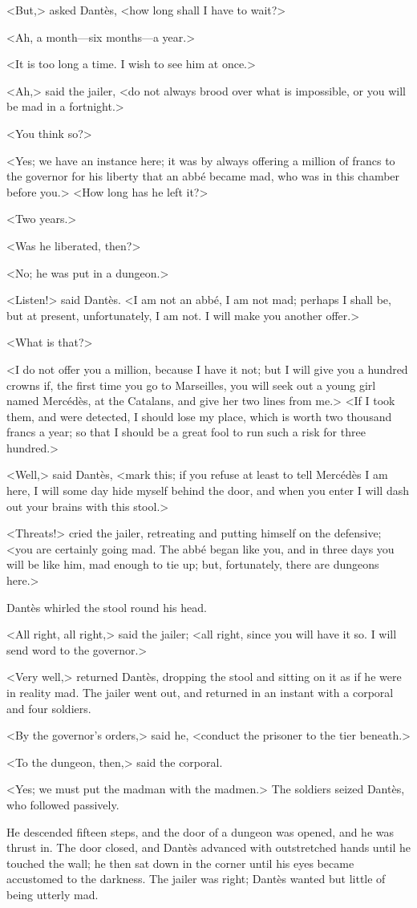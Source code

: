  <But,> asked Dantès, <how long shall I have to wait?> 

 <Ah, a month—six months—a year.> 

 <It is too long a time. I wish to see him at once.> 

 <Ah,> said the jailer, <do not always brood over what is impossible, or you will be mad in a fortnight.> 

 <You think so?> 

 <Yes; we have an instance here; it was by always offering a million of francs to the governor for his liberty that an abbé became mad, who was in this chamber before you.>  <How long has he left it?> 

 <Two years.> 

 <Was he liberated, then?> 

 <No; he was put in a dungeon.> 

 <Listen!> said Dantès. <I am not an abbé, I am not mad; perhaps I shall be, but at present, unfortunately, I am not. I will make you another offer.> 

 <What is that?> 

 <I do not offer you a million, because I have it not; but I will give you a hundred crowns if, the first time you go to Marseilles, you will seek out a young girl named Mercédès, at the Catalans, and give her two lines from me.>  <If I took them, and were detected, I should lose my place, which is worth two thousand francs a year; so that I should be a great fool to run such a risk for three hundred.> 

 <Well,> said Dantès, <mark this; if you refuse at least to tell Mercédès I am here, I will some day hide myself behind the door, and when you enter I will dash out your brains with this stool.> 

 <Threats!> cried the jailer, retreating and putting himself on the defensive; <you are certainly going mad. The abbé began like you, and in three days you will be like him, mad enough to tie up; but, fortunately, there are dungeons here.> 

 Dantès whirled the stool round his head. 

 <All right, all right,> said the jailer; <all right, since you will have it so. I will send word to the governor.> 

 <Very well,> returned Dantès, dropping the stool and sitting on it as if he were in reality mad. The jailer went out, and returned in an instant with a corporal and four soldiers. 

 <By the governor's orders,> said he, <conduct the prisoner to the tier beneath.> 

 <To the dungeon, then,> said the corporal. 

 <Yes; we must put the madman with the madmen.> The soldiers seized Dantès, who followed passively. 

 He descended fifteen steps, and the door of a dungeon was opened, and he was thrust in. The door closed, and Dantès advanced with outstretched hands until he touched the wall; he then sat down in the corner until his eyes became accustomed to the darkness. The jailer was right; Dantès wanted but little of being utterly mad. 